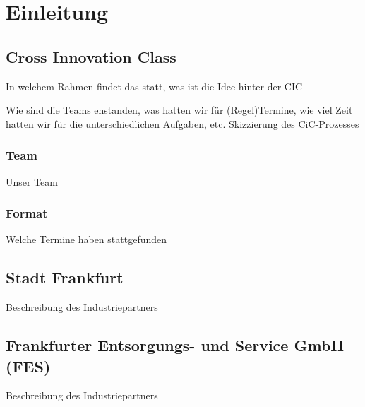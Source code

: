 \chapter{Einleitung}

\section{Cross Innovation Class}

    In welchem Rahmen findet das statt,
    was ist die Idee hinter der CIC

    Wie sind die Teams enstanden, was hatten wir für (Regel)Termine, wie viel Zeit hatten wir für die unterschiedlichen Aufgaben, etc.
    Skizzierung des CiC-Prozesses

    \subsection{Team}

        Unser Team


    \subsection{Format}

        Welche Termine haben stattgefunden


\section{Stadt Frankfurt}

    Beschreibung des Industriepartners


\section{Frankfurter Entsorgungs- und Service GmbH (FES)}

    Beschreibung des Industriepartners
